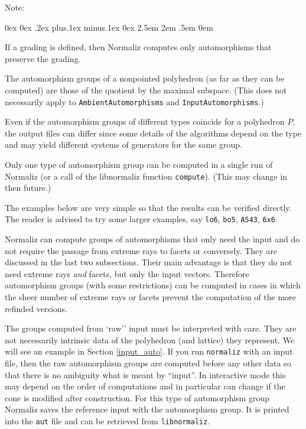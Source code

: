 \documentclass[12pt,a4paper]{scrartcl}
\newcounter{listi}
\newcommand{\stdli}{ \topsep0ex \partopsep0ex %
\parsep.2ex plus.1ex minus.1ex \itemsep0ex%
\leftmargin2.5em \labelwidth2em \labelsep.5em \rightmargin0em}%
\newenvironment{arab}{\begin{list}{\textup{(\arabic{listi})}}%
	{\usecounter{listi}\stdli}}{\end{list}}
\theoremstyle{definition}
\begin{document}
Note:
\begin{arab}
	\item If a grading is defined, then Normaliz computes only automorphisms that preserve the grading.
	\item The automorphism groups of a nonpointed polyhedron (as far as they can be computed) are those of the quotient by the maximal subspace. (This does not necessarily apply to \verb|AmbientAutomorphisms| and \verb|InputAutomorphisms|.)
	\item Even if the automorphism groups of different types coincide for a polyhedron $P$, the output files can differ since some details of the algorithms depend on the type and may yield different systems of generators for the same group.
	
	\item Only one type of automorphism group can be computed in a single run of Normaliz (or a call of the libnormaliz function \verb|compute|). (This may change in then future.)
\end{arab}

The examples below are very simple so that the results can be verified directly. The reader is advised to try some larger examples, say \verb|lo6|, \verb|bo5|, \verb|A543|, \verb|6x6|.

Normaliz can compute groups of automorphisms that only need the input and do not require the passage from extreme rays to facets or conversely. They are discussed in the last two subsections. Their main advantage is that they do not need extreme rays \emph{and} facets, but only the input vectors. Therefore automorphism groups (with some restrictions) can be computed in cases in which the sheer number of extreme rays or facets prevent the computation of the more refinded versions.

The groups computed from `raw'' input must be interpreted with care. They are not necessarily intrinsic data of the polyhedron (and lattice) they represent. We will see an example in Section \ref{input_auto}. If you run \verb|normaliz| with an input file, then the raw automorphism groups are computed before any other data so that there is no ambiguity what is meant by ``input''. In interactive mode this may depend on the order of computations and in particular can change if the cone is modified after construction. For this type of automorphism group Normaliz saves the reference input with the automorphism group. It is printed into the \verb|aut| file and can be retrieved from \verb|libnormaliz|.
\end{document}
